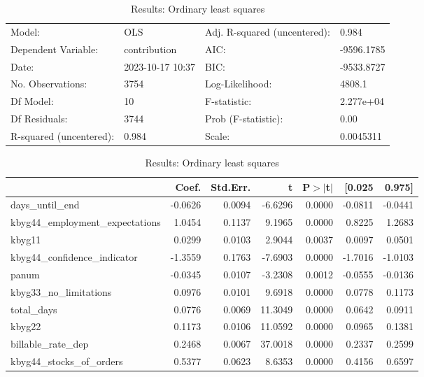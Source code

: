\begin{table}
\caption{Results: Ordinary least squares}
\label{}
\begin{center}
\begin{tabular}{llll}
\hline
Model:                  & OLS              & Adj. R-squared (uncentered): & 0.984       \\
Dependent Variable:     & contribution     & AIC:                         & -9596.1785  \\
Date:                   & 2023-10-17 10:37 & BIC:                         & -9533.8727  \\
No. Observations:       & 3754             & Log-Likelihood:              & 4808.1      \\
Df Model:               & 10               & F-statistic:                 & 2.277e+04   \\
Df Residuals:           & 3744             & Prob (F-statistic):          & 0.00        \\
R-squared (uncentered): & 0.984            & Scale:                       & 0.0045311   \\
\hline
\end{tabular}
\end{center}

\begin{center}
\begin{tabular}{lrrrrrr}
\hline
                                 &   Coef. & Std.Err. &       t & P$> |$t$|$ &  [0.025 &  0.975]  \\
\hline
days\_until\_end                 & -0.0626 &   0.0094 & -6.6296 &      0.0000 & -0.0811 & -0.0441  \\
kbyg44\_employment\_expectations &  1.0454 &   0.1137 &  9.1965 &      0.0000 &  0.8225 &  1.2683  \\
kbyg11                           &  0.0299 &   0.0103 &  2.9044 &      0.0037 &  0.0097 &  0.0501  \\
kbyg44\_confidence\_indicator    & -1.3559 &   0.1763 & -7.6903 &      0.0000 & -1.7016 & -1.0103  \\
panum                            & -0.0345 &   0.0107 & -3.2308 &      0.0012 & -0.0555 & -0.0136  \\
kbyg33\_no\_limitations          &  0.0976 &   0.0101 &  9.6918 &      0.0000 &  0.0778 &  0.1173  \\
total\_days                      &  0.0776 &   0.0069 & 11.3049 &      0.0000 &  0.0642 &  0.0911  \\
kbyg22                           &  0.1173 &   0.0106 & 11.0592 &      0.0000 &  0.0965 &  0.1381  \\
billable\_rate\_dep              &  0.2468 &   0.0067 & 37.0018 &      0.0000 &  0.2337 &  0.2599  \\
kbyg44\_stocks\_of\_orders       &  0.5377 &   0.0623 &  8.6353 &      0.0000 &  0.4156 &  0.6597  \\
\hline
\end{tabular}
\end{center}


\end{table}
